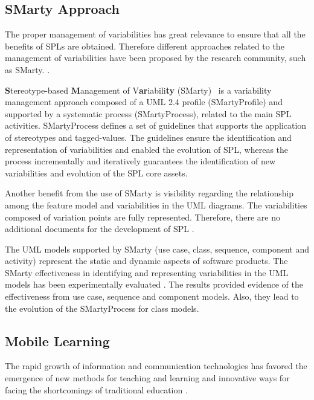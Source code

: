 \subsection{SMarty Approach}


The proper management of variabilities has great relevance to ensure that all the benefits of SPLs are obtained. Therefore different approaches related to the management of variabilities have been proposed by the research community, such as SMarty.  \cite{chen11,capilla13}.  

\textbf{S}tereotype-based \textbf{M}anagement of V\textbf{ar}iabili\textbf{ty} (SMarty)~\cite{oliveirajr10} is a variability management approach composed of a UML 2.4 profile (SMartyProfile) and supported by a systematic process (SMartyProcess), related to the main SPL activities. SMartyProcess defines a set of guidelines that supports the application of stereotypes and tagged-values. The guidelines ensure the identification and representation of variabilities and enabled the evolution of SPL, whereas the process incrementally and iteratively guarantees the identification of new variabilities and evolution of the SPL core assets.

Another benefit from the use of SMarty is visibility regarding the relationship among the feature model and variabilities in the UML diagrams. The variabilities composed of variation points are fully represented. Therefore, there are no additional documents for the development of SPL \cite{oliveirajr10}.

The UML models supported by SMarty (use case, class, sequence, component and activity) represent the static and dynamic aspects of software products. The SMarty effectiveness in identifying and representing variabilities in the UML models has been experimentally evaluated \cite{marcolino13,marcolino14a,marcolino14b,bera15}. The results provided evidence of the effectiveness from use case, sequence and component models. Also, they lead to the evolution of the SMartyProcess for class models.

\subsection{Mobile Learning}

The rapid growth of information and communication technologies has favored the emergence of new methods for teaching and learning and innovative ways for facing the shortcomings of traditional education \cite{west12}. 


